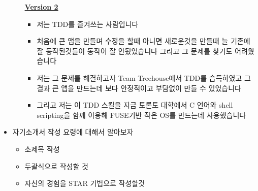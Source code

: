 \documentclass[12pt]{article}
\begin{document}
\begin{itemize}
\begin{itemize}
        \bigskip

        \underline{\textbf{Version 2}}

        \bigskip

        \begin{itemize}
            \item 저는 TDD를 즐겨쓰는 사람입니다
            \item 처음에 큰 앱을 만들며 수정을 할때 아니면 새로운것을 만들때 늘 기존에 잘 동작된것들이 동작이 잘 안됬었습니다 그리고 그 문제를 찾기도 어려웠습니다
            \item 저는 그 문제를 해결하고자 Team Treehouse에서 TDD를 습득하였고 그 결과
            큰 앱을 만드는데 보다 안정적이고 부담없이 만들 수 있었습니다
            \item 그리고 저는 이 TDD 스킬을 지금 토론토 대학에서 C 언어와 shell scripting을 함께 이용해 FUSE기반 작은 OS를 만드는데 사용했습니다
        \end{itemize}
    \end{itemize}
    \item 자기소개서 작성 요령에 대해서 알아보자
    \begin{itemize}
        \item 소제목 작성
        \item 두괄식으로 작성할 것
        \item 자신의 경험을 STAR 기법으로 작성할것
    \end{itemize}
\end{itemize}
\end{document}
